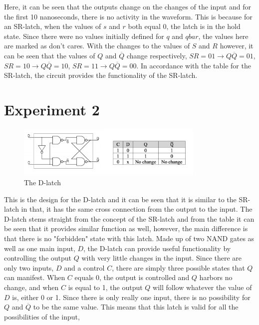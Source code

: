 \documentclass[12pt]{article}
\begin{document}
    \par Here, it can be seen that the outputs change on the changes of the
    input and for the first 10 nanoseconds, there is no activity in the
    waveform. This is because for an SR-latch, when the values of $s$ and $r$
    both equal 0, the latch is in the hold state. Since there were no values
    initially defined for $q$ and $qbar$, the values here are marked as don't
    cares. With the changes to the values of $S$ and $R$ however, it can be seen
    that the values of $Q$ and $\overline{Q}$ change respectively, $S R = 01 \to
    Q \overline{Q} = 01$, $S R = 10 \to Q \overline{Q} = 10$, $S R = 11 \to Q
    \overline{Q} = 00$. In accordance with the table for the SR-latch, the
    circuit provides the functionality of the SR-latch.
    \section*{Experiment 2}
    \begin{figure}[h]
        \centering
        \includegraphics[width=0.8\textwidth]{DLatch.png}
        \caption{The D-latch}
    \end{figure}
    \par This is the design for the D-latch and it can be seen that it is
    similar to the SR-latch in that, it has the same cross connection from the
    output to the input. The D-latch stems straight from the concept of the
    SR-latch and from the table it can be seen that it provides similar function
    as well, however, the main difference is that there is no "forbidden" state
    with this latch. Made up of two NAND gates as well as one main input, $D$,
    the D-latch can provide useful functionality by controlling the output $Q$
    with very little changes in the input. Since there are only two inputs, $D$
    and a control $C$, there are simply three possible states that $Q$ can
    manifest. When $C$ equals 0, the output is controlled and $Q$ harbors no
    change, and when $C$ is equal to 1, the output $Q$ will follow whatever the
    value of $D$ is, either 0 or 1. Since there is only really one input, there
    is no possibility for $Q$ and $\overline{Q}$ to be the same value. This
    means that this latch is valid for all the possibilities of the input,
\end{document}
